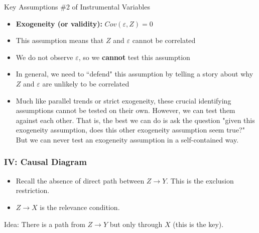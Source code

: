 \documentclass[aspectratio=169,11pt]{beamer}
\begin{document}
\begin{frame}{Key Assumptions \#2 of Instrumental Variables}
\begin{itemize}
	\item {\bf Exogeneity (or validity):} $Cov(\varepsilon,Z)= 0$
\medskip
\item This assumption means that $Z$ and $\varepsilon$ cannot be correlated
\medskip
\item We do not observe $\varepsilon$, so we \textbf{cannot} test this assumption
\medskip
\item In general, we need to ``defend" this assumption by telling a story about why $Z$ and $\varepsilon$ are unlikely to be correlated
\medskip
\item Much like parallel trends or strict exogeneity, these crucial identifying assumptions cannot
be tested on their own. However, we can test them against each other. That is, the best we can
do is ask the question "given this exogeneity assumption, does this other exogeneity assumption seem
true?" But we can never test an exogeneity assumption in a self-contained way. 
\end{itemize}
\end{frame}




\begin{frame}
\frametitle{IV: Causal Diagram}
\begin{itemize}
\item Recall the absence of direct path between $Z \rightarrow Y$. This is the \alert{exclusion restriction}.
\item $Z \rightarrow X$ is the \alert{relevance} condition.
\end{itemize}
\vspace{0.5cm}
\begin{center}
\end{center}
Idea: There is a path from $Z \rightarrow Y$ but only \alert{through} $X$ (this is the key).
\end{frame}
\end{document}
